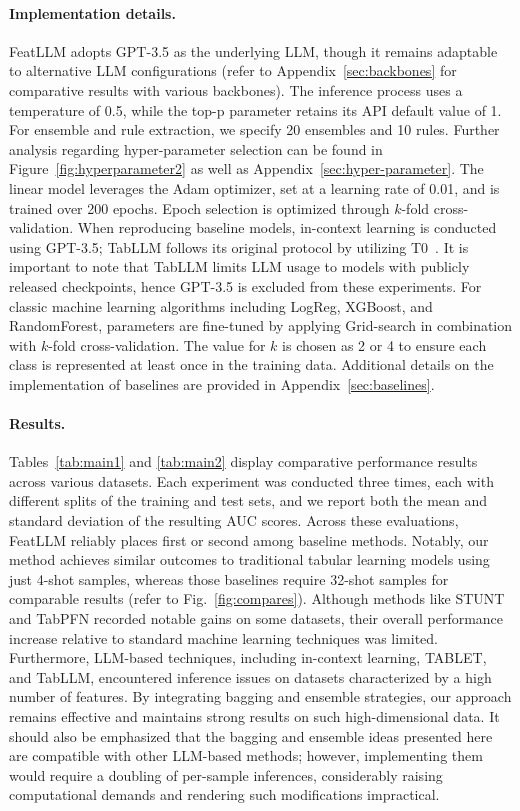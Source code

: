 \paragraph{Implementation details.}
\textsf{FeatLLM} adopts GPT-3.5 as the underlying LLM, though it remains adaptable to alternative LLM configurations (refer to Appendix~\ref{sec:backbones} for comparative results with various backbones). The inference process uses a temperature of 0.5, while the top-p parameter retains its API default value of 1. For ensemble and rule extraction, we specify 20 ensembles and 10 rules. Further analysis regarding hyper-parameter selection can be found in Figure~\ref{fig:hyperparameter2} as well as Appendix~\ref{sec:hyper-parameter}. The linear model leverages the Adam optimizer, set at a learning rate of 0.01, and is trained over 200 epochs. Epoch selection is optimized through $k$-fold cross-validation. When reproducing baseline models, in-context learning is conducted using GPT-3.5; TabLLM follows its original protocol by utilizing T0~\cite{sanh2022multitask}. It is important to note that TabLLM limits LLM usage to models with publicly released checkpoints, hence GPT-3.5 is excluded from these experiments. For classic machine learning algorithms including LogReg, XGBoost, and RandomForest, parameters are fine-tuned by applying Grid-search in combination with $k$-fold cross-validation. The value for $k$ is chosen as 2 or 4 to ensure each class is represented at least once in the training data. Additional details on the implementation of baselines are provided in Appendix~\ref{sec:baselines}.

\vspace*{-0.12in}
\paragraph{Results.}
Tables~\ref{tab:main1} and \ref{tab:main2} display comparative performance results across various datasets. Each experiment was conducted three times, each with different splits of the training and test sets, and we report both the mean and standard deviation of the resulting AUC scores. Across these evaluations, \textsf{FeatLLM} reliably places first or second among baseline methods. Notably, our method achieves similar outcomes to traditional tabular learning models using just 4-shot samples, whereas those baselines require 32-shot samples for comparable results (refer to Fig.~\ref{fig:compares}). Although methods like STUNT and TabPFN recorded notable gains on some datasets, their overall performance increase relative to standard machine learning techniques was limited. Furthermore, LLM-based techniques, including in-context learning, TABLET, and TabLLM, encountered inference issues on datasets characterized by a high number of features. By integrating bagging and ensemble strategies, our approach remains effective and maintains strong results on such high-dimensional data. It should also be emphasized that the bagging and ensemble ideas presented here are compatible with other LLM-based methods; however, implementing them would require a doubling of per-sample inferences, considerably raising computational demands and rendering such modifications impractical.

